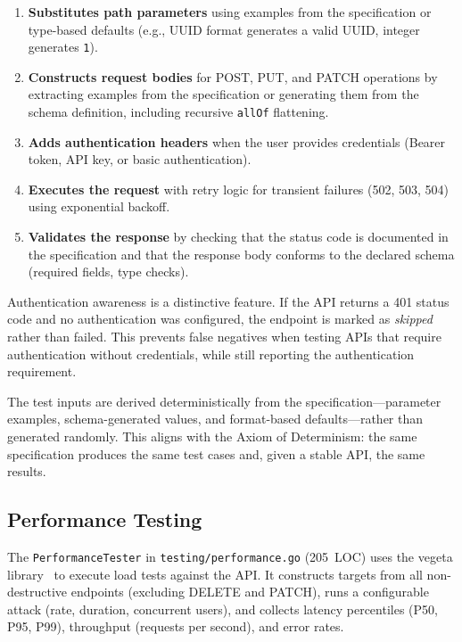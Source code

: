\begin{enumerate}
    \item \textbf{Substitutes path parameters} using examples from the specification or type-based defaults (e.g., UUID format generates a valid UUID, integer generates \texttt{1}).
    \item \textbf{Constructs request bodies} for POST, PUT, and PATCH operations by extracting examples from the specification or generating them from the schema definition, including recursive \texttt{allOf} flattening.
    \item \textbf{Adds authentication headers} when the user provides credentials (Bearer token, API key, or basic authentication).
    \item \textbf{Executes the request} with retry logic for transient failures (502, 503, 504) using exponential backoff.
    \item \textbf{Validates the response} by checking that the status code is documented in the specification and that the response body conforms to the declared schema (required fields, type checks).
\end{enumerate}

Authentication awareness is a distinctive feature. If the API returns a 401 status code and no authentication was configured, the endpoint is marked as \textit{skipped} rather than failed. This prevents false negatives when testing APIs that require authentication without credentials, while still reporting the authentication requirement.

The test inputs are derived deterministically from the specification---parameter examples, schema-generated values, and format-based defaults---rather than generated randomly. This aligns with the Axiom of Determinism: the same specification produces the same test cases and, given a stable API, the same results.

\subsection{Performance Testing}
\label{subsec:performance-testing}

The \texttt{PerformanceTester} in \texttt{testing/performance.go} (205~LOC) uses the vegeta library~\cite{vegeta} to execute load tests against the API. It constructs targets from all non-destructive endpoints (excluding DELETE and PATCH), runs a configurable attack (rate, duration, concurrent users), and collects latency percentiles (P50, P95, P99), throughput (requests per second), and error rates.

